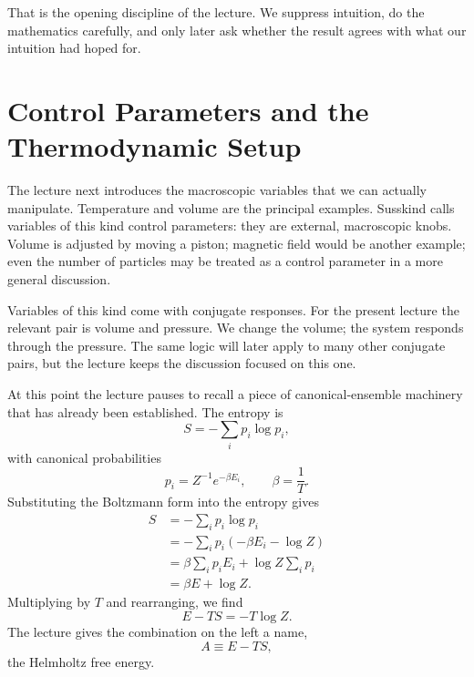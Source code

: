 That is the opening discipline of the lecture. We suppress intuition, do the mathematics carefully, and only later ask whether the result agrees with what our intuition had hoped for.

\section{Control Parameters and the Thermodynamic Setup}

The lecture next introduces the macroscopic variables that we can actually manipulate. Temperature and volume are the principal examples. Susskind calls variables of this kind control parameters: they are external, macroscopic knobs. Volume is adjusted by moving a piston; magnetic field would be another example; even the number of particles may be treated as a control parameter in a more general discussion.

Variables of this kind come with conjugate responses. For the present lecture the relevant pair is volume and pressure. We change the volume; the system responds through the pressure. The same logic will later apply to many other conjugate pairs, but the lecture keeps the discussion focused on this one.

At this point the lecture pauses to recall a piece of canonical-ensemble machinery that has already been established. The entropy is
\begin{equation}
S = -\sum_i p_i \log p_i,
\end{equation}
with canonical probabilities
\begin{equation}
p_i = Z^{-1} e^{-\beta E_i},
\qquad
\beta = \frac{1}{T}.
\end{equation}
Substituting the Boltzmann form into the entropy gives
\begin{align}
S
&= -\sum_i p_i \log p_i \\
&= -\sum_i p_i \left(-\beta E_i - \log Z\right) \\
&= \beta \sum_i p_i E_i + \log Z \sum_i p_i \\
&= \beta E + \log Z.
\end{align}
Multiplying by \(T\) and rearranging, we find
\begin{equation}
E - TS = -T \log Z.
\end{equation}
The lecture gives the combination on the left a name,
\begin{equation}
A \equiv E - TS,
\end{equation}
the Helmholtz free energy.

